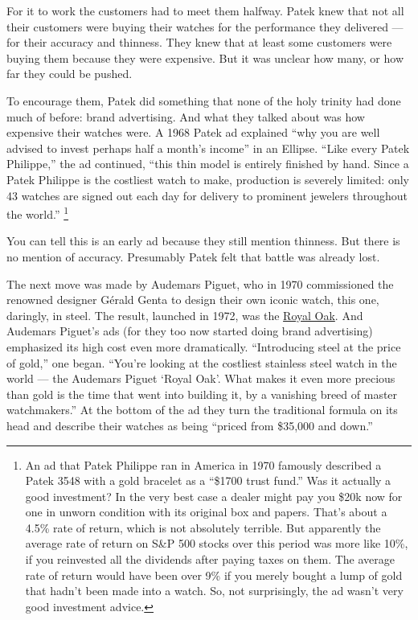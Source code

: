 \documentclass[12pt]{book}
\begin{document}
For it to work the customers had to meet them halfway. Patek knew that
not all their customers were buying their watches for the performance
they delivered --- for their accuracy and thinness. They knew that at
least some customers were buying them because they were expensive. But
it was unclear how many, or how far they could be pushed.

To encourage them, Patek did something that none of the holy trinity had
done much of before: brand advertising. And what they talked about was
how expensive their watches were. A 1968 Patek ad explained ``why you
are well advised to invest perhaps half a month's income'' in an
Ellipse. ``Like every Patek Philippe,'' the ad continued, ``this thin
model is entirely finished by hand. Since a Patek Philippe is the
costliest watch to make, production is severely limited: only 43 watches
are signed out each day for delivery to prominent jewelers throughout
the world.'' \footnote{An ad that Patek Philippe ran in America in 1970 famously
described a Patek 3548 with a gold bracelet as a ``\$1700 trust fund.''
Was it actually a good investment? In the very best case a dealer might
pay you \$20k now for one in unworn condition with its original box and
papers. That's about a 4.5\% rate of return, which is not absolutely
terrible. But apparently the average rate of return on S\&P 500 stocks
over this period was more like 10\%, if you reinvested all the dividends
after paying taxes on them. The average rate of return would have been
over 9\% if you merely bought a lump of gold that hadn't been made into
a watch. So, not surprisingly, the ad wasn't very good investment
advice.}

You can tell this is an early ad because they still mention thinness.
But there is no mention of accuracy. Presumably Patek felt that battle
was already lost.

The next move was made by Audemars Piguet, who in 1970 commissioned the
renowned designer Gérald Genta to design their own iconic watch, this
one, daringly, in steel. The result, launched in 1972, was the
\href{https://www.sothebys.com/en/buy/auction/2025/fine-watches-5/reference-5402st-jumbo-royal-oak-a-series-a}{Royal
Oak}. And Audemars Piguet's ads (for they too now started doing brand
advertising) emphasized its high cost even more dramatically.
``Introducing steel at the price of gold,'' one began. ``You're looking
at the costliest stainless steel watch in the world --- the Audemars
Piguet `Royal Oak'. What makes it even more precious than gold is the
time that went into building it, by a vanishing breed of master
watchmakers.'' At the bottom of the ad they turn the traditional formula
on its head and describe their watches as being ``priced from \$35,000
and down.''
\end{document}
